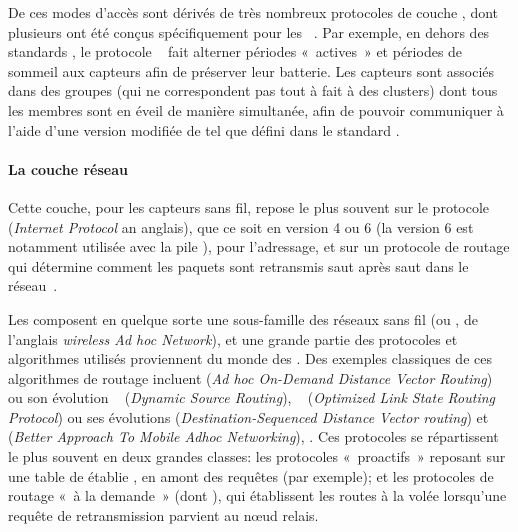 
De ces modes d'accès sont dérivés de très nombreux protocoles de couche \mac, dont plusieurs ont été conçus spécifiquement pour les \rcs~\cite{YB09}.
Par exemple, en dehors des standards \ieee, le protocole \smac~\cite{YHE02} fait alterner périodes « actives » et périodes de sommeil aux capteurs afin de préserver leur batterie.
Les capteurs sont associés dans des groupes (qui ne correspondent pas tout à fait à des clusters) dont tous les membres sont en éveil de manière simultanée, afin de pouvoir communiquer à l'aide d'une version modifiée de \csmaca tel que défini dans le standard \ieeee.

            \paragraph{La couche réseau}
Cette couche, pour les capteurs sans fil, repose le plus souvent sur le protocole \ip (\textit{Internet Protocol} an anglais), que ce soit en version 4 ou 6 (la version 6 est notamment utilisée avec la pile \slowpan), pour l'adressage, et sur un protocole de routage qui détermine comment les paquets sont retransmis saut après saut dans le réseau~\cite{TW10}.

Les \rcsfs composent en quelque sorte une sous-famille des réseaux sans fil \adhoc (ou \wanet, de l'anglais \textit{wireless Ad hoc Network}), et une grande partie des protocoles et algorithmes utilisés proviennent du monde des \wanet.
Des exemples classiques de ces algorithmes de routage incluent \aodv (\textit{Ad hoc On-Demand Distance Vector Routing})~\cite{aodv} ou son évolution \dsr~\cite{dsr} (\textit{Dynamic Source Routing}), \olsr~\cite{olsr} (\textit{Optimized Link State Routing Protocol}) ou ses évolutions \dsdv (\textit{Destination-Sequenced Distance Vector routing}) et \batman (\textit{Better Approach To Mobile Adhoc Networking}), \etc.
Ces protocoles se répartissent le plus souvent en deux grandes classes: les protocoles « proactifs » reposant sur une table de  établie \apriori, en amont des requêtes (\aodv par exemple); et les protocoles de routage « à la demande » (dont \olsr), qui établissent les routes à la volée lorsqu'une requête de retransmission parvient au nœud relais.

